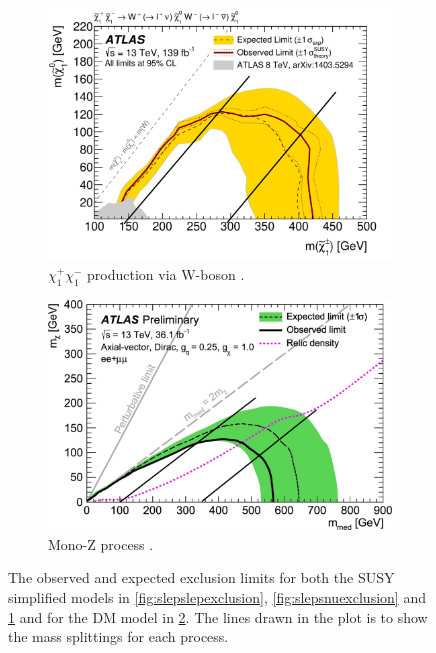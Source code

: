 \begin{figure}[H]
    \begin{subfigure}[t!]{0.49\textwidth}
        \includegraphics[width = \textwidth]{Figures/FromOnline/WW.pdf}
        \caption{$\chi_1^+ \chi_1^-$ production via W-boson \cite{sleptonexclusion}.}
        \label{fig:WWexclusion}
    \end{subfigure}
    \begin{subfigure}[t!]{0.49\textwidth}
        \includegraphics[width = \textwidth]{Figures/FromOnline/mono_Z.pdf}
        \caption{Mono-Z process \cite{monoZexclusion}.}
        \label{fig:monoZexclusion}
    \end{subfigure}
    \caption{The observed and expected exclusion limits for both the SUSY simplified models in \ref{fig:slepslepexclusion}, \ref{fig:slepsnuexclusion} and \ref{fig:WWexclusion} and for the DM model in \ref{fig:monoZexclusion}. The lines drawn in the plot is to show the mass splittings for each process.}
    \label{fig:exclusionPlots}
\end{figure}

